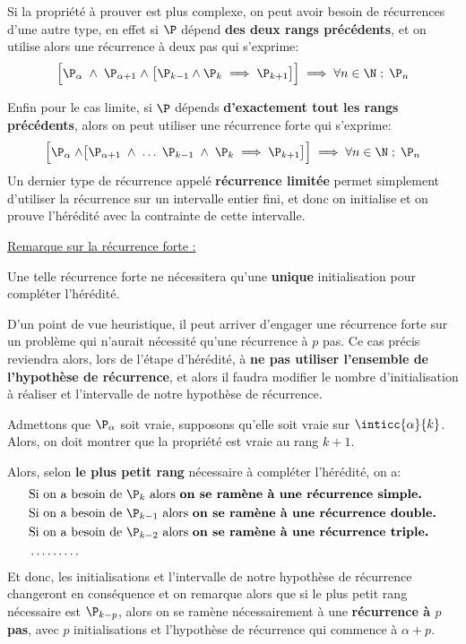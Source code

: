Si la propriété à prouver est plus complexe, on peut avoir besoin de récurrences d'une autre type, en effet si \(\P\) dépend \textbf{des deux rangs précédents}, et on utilise alors une récurrence à deux pas qui s'exprime:
\[
   \Bigr[ \P_{\alpha} \; \land \; \P_{\alpha + 1} \; \land \; \bigr[ \P_{k-1}  \land \P_{k}\implies \P_{k+1} \bigr] \Bigr] \implies \forall n \in \N \; ; \; \P_n   
\]

Enfin pour le cas limite, si \(\P\) dépends \textbf{d'exactement tout les rangs précédents}, alors on peut utiliser une récurrence forte qui s'exprime:
\[
   \Bigr[ \P_{\alpha} \; \land \bigr[ \P_{\alpha + 1} \; \land \; \ldots \; \P_{k-1} \; \land \; \P_{k} \implies \P_{k+1}  \bigr] \Bigr] \implies \forall n \in \N \; ; \; \P_n   
\]
Un dernier type de récurrence appelé \textbf{récurrence limitée} permet simplement d'utiliser la récurrence sur un intervalle entier fini, et donc on initialise et on prouve l'hérédité avec la contrainte de cette intervalle.\<


\underline{Remarque sur la récurrence forte {:}}\<

Une telle récurrence forte ne nécessitera qu'une \textbf{unique} initialisation pour compléter l'hérédité.\<

D'un point de vue heuristique, il peut arriver d'engager une récurrence forte sur un problème qui n'aurait nécessité qu'une récurrence à \(p\) pas.\+
Ce cas précis reviendra alors, lors de l'étape d'hérédité, à \textbf{ne pas utiliser l'ensemble de l'hypothèse de récurrence}, et alors il faudra modifier le nombre d'initialisation à réaliser et l'intervalle de notre hypothèse de récurrence.\<

Admettons que \(\P_\alpha\) soit vraie, supposons qu'elle soit vraie sur \(\inticc{\alpha}{k}\). Alors, on doit montrer que la propriété est vraie au rang \(k + 1\).\<

Alors, selon \textbf{le plus petit rang} nécessaire à compléter l'hérédité, on a:
\begin{align*}
    & \text{Si on a besoin de } \P_k \text{ alors \textbf{on se ramène à une récurrence simple.}}\\
    & \text{Si on a besoin de } \P_{k-1} \text{ alors \textbf{on se ramène à une récurrence double.}}\\
    & \text{Si on a besoin de } \P_{k-2} \text{ alors \textbf{on se ramène à une récurrence triple.}}\\
    & \ldots\ldots\ldots
\end{align*}
Et donc, les initialisations et l'intervalle de notre hypothèse de récurrence changeront en conséquence et on remarque alors que si le plus petit rang nécessaire est \(\P_{k-p}\), alors on se ramène nécessairement à une \textbf{récurrence à \(p\) pas}, avec \(p\) initialisations et l'hypothèse de récurrence qui commence à \(\alpha + p\).\<

